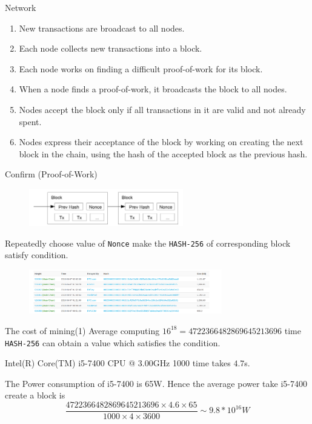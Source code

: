 \documentclass[serif]{beamer}
\begin{document}
	
	\begin{frame}{Network}
		\begin{enumerate}[<+->]
			\item New transactions are broadcast to all nodes.
			\item Each node collects new transactions into a block.
			\item Each node works on finding a difficult proof-of-work for its block.
			\item When a node finds a proof-of-work, it broadcasts the block to all nodes.
			\item Nodes accept the block only if all transactions in it are valid and not already spent.
			\item Nodes express their acceptance of the block by working on creating the next block in the
			chain, using the hash of the accepted block as the previous hash.
		\end{enumerate}
		
	\end{frame}
		\begin{frame}{Confirm (Proof-of-Work)}
			\begin{figure}
				\includegraphics[width=0.6\textwidth]{proof}
				\label{fig:result3}
			\end{figure}
			Repeatedly choose value  of {\tt Nonce} make the {\tt HASH-256} of corresponding block satisfy 
			condition.
			\begin{example}
				\begin{figure}
					\includegraphics[width=0.75\textwidth]{example1}
					\label{fig:result4}
				\end{figure}
			\end{example}
			
		\end{frame}
	\begin{frame}{The cost of mining(1)}
		Average computing $16^{18}=4722366482869645213696$ time {\tt HASH-256} can obtain a value which satisfies the condition.
		\begin{example}	
			Intel(R) Core(TM) i5-7400 CPU @ 3.00GHz
			1000 time takes $4.7$s.	
		\end{example}
			The Power consumption of  i5-7400  is 65W. Hence the average power take  i5-7400 create a 
			block is $$\frac{4722366482869645213696\times 4.6\times 65}{1000\times 4\times 3600}\sim 9.8*10^{16} W$$
			
	\end{frame}
\end{document}
